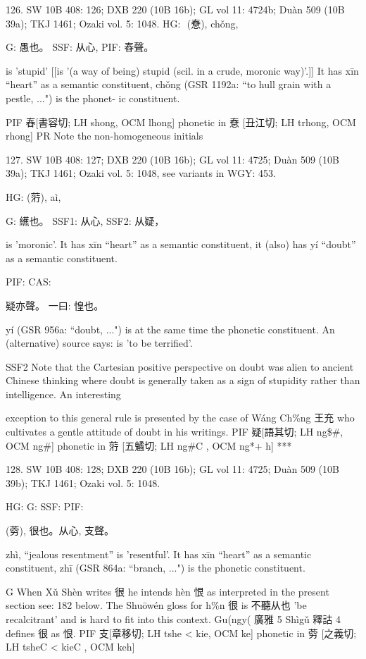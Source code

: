 126. SW 10B 408: 126; DXB 220 (10B 16b); GL vol 11: 4724b; Duàn 509 (10B 39a); TKJ 1461; Ozaki vol. 5: 1048.
HG:  (憃), chǒng,

G:	愚也。
SSF: 从心,
PIF: 舂聲。

is 'stupid' [[is '(a way of being) stupid (scil. in a crude, moronic way)'.]]
It has xīn ``heart'' as a semantic constituent,
chǒng (GSR 1192a: ``to hull grain with a pestle, ...") is the phonet- ic constituent.

PIF     舂[書容切; LH shong, OCM lhong] phonetic in 憃 [丑江切; LH trhong, OCM rhong]
PR	Note the non-homogeneous initials


127. SW 10B 408: 127; DXB 220 (10B 16b); GL vol 11: 4725; Duàn 509 (10B 39a); TKJ 1461; Ozaki vol. 5: 1048, see
variants in WGY: 453.

HG:	(䓷), aì,

G:	䌭也。
SSF1: 从心,
SSF2: 从疑，

is 'moronic'.
It has xīn ``heart'' as a semantic constituent,
it (also) has yí ``doubt'' as a semantic constituent.

PIF: CAS:

疑亦聲。
一曰: 惶也。

yí (GSR 956a: ``doubt, ...") is at the same time the phonetic constituent.
An (alternative) source says: is 'to be terrified'.

SSF2 Note that the Cartesian positive perspective on doubt was alien to ancient Chinese thinking where doubt is generally taken as a sign of stupidity rather than intelligence. An interesting



exception to this general rule is presented by the case of Wáng Ch\%ng 王充 who cultivates a gentle attitude of doubt in his writings.
PIF     疑[語其切; LH ng\$\#, OCM ng\#] phonetic in 䓷 [五䰬切; LH ng\#C , OCM ng*+ h]
***

128. SW 10B 408: 128; DXB 220 (10B 16b); GL vol 11: 4725; Duàn 509 (10B 39b); TKJ 1461; Ozaki vol. 5: 1048.


HG:
G: SSF: PIF:

  (䓖),
很也。从心, 支聲。


zhì, ``jealous resentment'' is 'resentful'.
It has xīn ``heart'' as a semantic constituent,
zhī (GSR 864a: ``branch, ...") is the phonetic constituent.

G     When Xǔ Shèn writes 很 he intends hèn 恨 as interpreted in the present section see: 182 below. The Shuōwén gloss for h\%n 很 is 不聽从也 'be recalcitrant' and is hard to fit into this context. Gu(ngy( 廣雅 5 Shìgǔ 釋詁 4 defines 很 as 恨.
PIF   支[章移切; LH tshe < kie, OCM ke] phonetic in 䓖 [之義切; LH tsheC < kieC , OCM keh]


